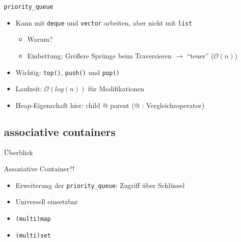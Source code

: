 \begin{frame}{\texttt{priority\_queue}}
	\begin{itemize}
		\item Kann mit \texttt{deque} und \texttt{vector} arbeiten, aber nicht mit \texttt{list}
		\begin{itemize}
			\item \alert{Warum?}
			\pause
			\item Einbettung: Größere Sprünge beim Traversieren $\rightarrow$ \enquote{teuer} ($\mathcal{O}(n)$)
		\end{itemize}
		\item Wichtig: \texttt{top()}, \texttt{push()} und \texttt{pop()}
		\pause
		\item Laufzeit: $\mathcal{O}(log(n))$ für Modifikationen
		\item Heap-Eigenschaft hier: child @ parent (@ : Vergleichsoperator)
	\end{itemize}
	
	\pause
	
	
\end{frame}

\subsection{associative containers}

\begin{frame}{Überblick}
	\begin{block}{Assoziative Container?!}
	 	\begin{itemize}
	 		\item Erweiterung der \texttt{priority\_queue}: Zugriff über Schlüssel
	 		\item Universell einsetzbar
	 	\end{itemize}
 	\end{block}
 	
 	\pause
 	
	\begin{itemize}
		\item \texttt{(multi)map}
		\item \texttt{(multi)set}
	\end{itemize}
\end{frame}

